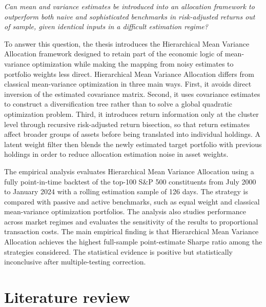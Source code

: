 \documentclass[12pt]{article}
\begin{document}
\textit{Can mean and variance estimates be introduced into an allocation framework to outperform both naive and sophisticated benchmarks in risk-adjusted returns out of sample, given identical inputs in a difficult estimation regime?} 

To answer this question, the thesis introduces the Hierarchical Mean Variance Allocation framework designed to retain part of the economic logic of mean-variance optimization while making the mapping from noisy estimates to portfolio weights less direct. Hierarchical Mean Variance Allocation differs from classical mean-variance optimization in three main ways. First, it avoids direct inversion of the estimated covariance matrix. Second, it uses covariance estimates to construct a diversification tree rather than to solve a global quadratic optimization problem. Third, it introduces return information only at the cluster level through recursive risk-adjusted return bisection, so that return estimates affect broader groups of assets before being translated into individual holdings. A latent weight filter then blends the newly estimated target portfolio with previous holdings in order to reduce allocation estimation noise in asset weights.

The empirical analysis evaluates Hierarchical Mean Variance Allocation using a fully point-in-time backtest of the top-100 S\&P 500 constituents from July 2000 to January 2024 with a rolling estimation sample of 126 days. The strategy is compared with passive and active benchmarks, such as equal weight and classical mean-variance optimization portfolios. The analysis also studies performance across market regimes and evaluates the sensitivity of the results to proportional transaction costs. The main empirical finding is that Hierarchical Mean Variance Allocation achieves the highest full-sample point-estimate Sharpe ratio among the strategies considered. The statistical evidence is positive but statistically inconclusive after multiple-testing correction.

\section{Literature review}
\label{sec:lit-review}
\end{document}

